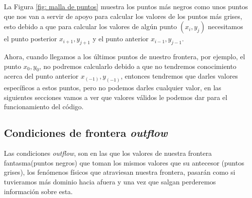 \documentclass[12pt,a4paper]{book}
\begin{document}
La Figura \ref{fig: malla de puntos} muestra 
los puntos más negros como unos puntos que nos van a 
servir de apoyo para calcular los valores de los puntos más grises, esto debido a que para calcular 
los valores de algún punto $(x_i, y_j)$ necesitamos el punto posterior $x_{i+1}, y_{j+1}$ y el punto 
anterior $x_{i-1}, y_{j-1}$.

Ahora, cuando llegamos a los últimos puntos de nuestro frontera, 
por ejemplo, el punto $x_{0}, y_{0}$, no podremos calcularlo debido a que 
no tendremos conocimiento acerca del punto anterior $x_{(-1)}, y_{(-1)}$, entonces 
tendremos que darles valores específicos a estos puntos, pero no podemos darles cualquier valor, 
en las siguientes secciones vamos a ver que valores válidos le podemos dar para el funcionamiento 
del código. 

\subsection{Condiciones de frontera \emph{outflow}}

Las condiciones \emph{outflow}, son en las que los valores de nuestra frontera fantasma(puntos negros) que toman los  mismos valores que su antecesor (puntos grises), los fenómenos físicos que atraviesan nuestra frontera, pasarán como si tuvieramos más dominio hacia afuera y una vez que salgan perderemos información sobre esta.
\end{document}
